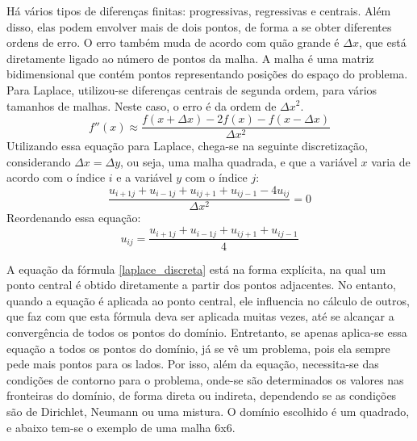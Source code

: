 \documentclass[journal]{IEEEtran}
\begin{document}
Há vários tipos de diferenças finitas: progressivas, regressivas e centrais. Além disso, elas podem envolver mais de dois pontos, de forma a se obter diferentes ordens de erro. O erro também muda de acordo com quão grande é $\Delta x$, que está diretamente ligado ao número de pontos da malha. A malha é uma matriz bidimensional que contém pontos representando posições do espaço do problema. Para Laplace, utilizou-se diferenças centrais de segunda ordem, para vários tamanhos de malhas. Neste caso, o erro é da ordem de $\Delta x^2$.
\begin{equation}
f''(x)\approx \frac{f(x+\Delta x)-2f(x)-f(x-\Delta x)}{\Delta x^2}
\end{equation}
Utilizando essa equação para Laplace, chega-se na seguinte discretização, considerando $\Delta x=\Delta y$, ou seja, uma malha quadrada, e que a variável $x$ varia de acordo com o índice $i$ e a variável $y$ com o índice $j$:
\begin{equation}
\frac{u_{i+1j}+u_{i-1j}+u_{ij+1}+u_{ij-1}-4u_{ij}}{\Delta x^2}=0 \label{laplace_discreta_zero}
\end{equation}
Reordenando essa equação:
\begin{equation}
  u_{ij}=\frac{u_{i+1j}+u_{i-1j}+u_{ij+1}+u_{ij-1}}{4} \label{laplace_discreta}
\end{equation}

A equação da fórmula \ref{laplace_discreta} está na forma explícita, na qual um ponto central é obtido diretamente a partir dos pontos adjacentes. No entanto, quando a equação é aplicada ao ponto central, ele influencia no cálculo de outros, que faz com que esta fórmula deva ser aplicada muitas vezes, até se alcançar a convergência de todos os pontos do domínio. Entretanto, se apenas aplica-se essa equação a todos os pontos do domínio, já se vê um problema, pois ela sempre pede mais pontos para os lados. Por isso, além da equação, necessita-se das condições de contorno para o problema, onde-se são determinados os valores nas fronteiras do domínio, de forma direta ou indireta, dependendo se as condições são de Dirichlet, Neumann ou uma mistura. O domínio escolhido é um quadrado, e abaixo tem-se o exemplo de uma malha 6x6.

\end{document}
